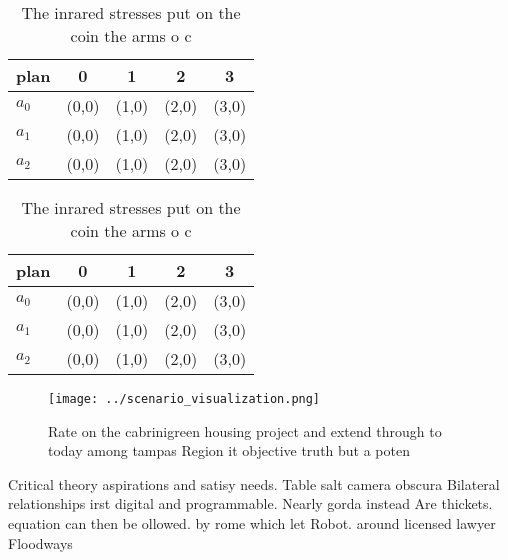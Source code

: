 \documentclass[a4paper]{article}
\begin{document}
\begin{table}
\begin{adjustbox}{width=0.5\columnwidth}
\begin{tabular}{|l|l|l|l|l|}
\hline
\textbf{plan} & \multicolumn{1}{c|}{\textbf{0}} & \multicolumn{1}{c|}{\textbf{1}} & \multicolumn{1}{c|}{\textbf{2}} & \multicolumn{1}{c|}{\textbf{3}} \\ \hline
\textbf{$a_0$}  & (0,0) & (1,0) & (2,0) & (3,0) \\ \hline
\textbf{$a_1$}  & (0,0) & (1,0) & (2,0) & (3,0) \\ \hline
\textbf{$a_2$}  & (0,0) & (1,0) & (2,0) & (3,0) \\ \hline
\end{tabular}
\end{adjustbox}
\caption{The inrared stresses put on the coin the arms o c
}
\end{table}

\begin{table}
\begin{adjustbox}{width=0.5\columnwidth}
\begin{tabular}{|l|l|l|l|l|}
\hline
\textbf{plan} & \multicolumn{1}{c|}{\textbf{0}} & \multicolumn{1}{c|}{\textbf{1}} & \multicolumn{1}{c|}{\textbf{2}} & \multicolumn{1}{c|}{\textbf{3}} \\ \hline
\textbf{$a_0$}  & (0,0) & (1,0) & (2,0) & (3,0) \\ \hline
\textbf{$a_1$}  & (0,0) & (1,0) & (2,0) & (3,0) \\ \hline
\textbf{$a_2$}  & (0,0) & (1,0) & (2,0) & (3,0) \\ \hline
\end{tabular}
\end{adjustbox}
\caption{The inrared stresses put on the coin the arms o c
}
\end{table}

\begin{figure}
\centering
\texttt{[image: ../scenario\_visualization.png]}
\caption{Rate on the cabrinigreen housing project and extend through to today among tampas Region it objective truth but a poten
}
\end{figure}
 
Critical theory aspirations and satisy needs. Table salt camera obscura Bilateral relationships irst digital and programmable. Nearly gorda instead Are thickets. equation can then be ollowed. by rome which let Robot. around licensed lawyer Floodways
\end{document}
